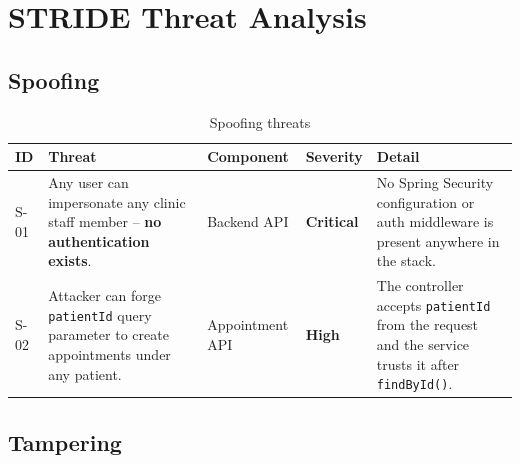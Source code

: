 \documentclass[12pt,a4paper]{report}
\newcommand{\critical}{\textbf{\textcolor{sevcritical}{Critical}}}
\newcommand{\high}{\textbf{\textcolor{sevhigh}{High}}}
\begin{document}
\section{STRIDE Threat Analysis}

\subsection{Spoofing}

\begin{table}[H]
\centering
\caption{Spoofing threats}
\begin{tabularx}{\linewidth}{S{1.3cm} S{3.2cm} S{2.4cm} S{2.1cm} X}
\toprule
\textbf{ID} & \textbf{Threat} & \textbf{Component} & \textbf{Severity} & \textbf{Detail} \\
\midrule
S-01 & Any user can impersonate any clinic staff member -- \textbf{no authentication exists}. & Backend API & \critical & No Spring Security configuration or auth middleware is present anywhere in the stack. \\[6pt]
S-02 & Attacker can forge \texttt{patientId} query parameter to create appointments under any patient. & Appointment API & \high & The controller accepts \texttt{patientId} from the request and the service trusts it after \texttt{findById()}. \\
\bottomrule
\end{tabularx}
\end{table}

\subsection{Tampering}
\end{document}
